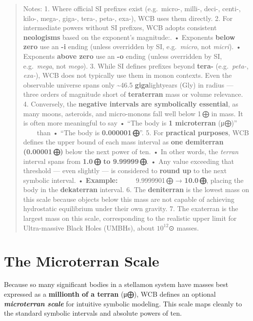 \documentclass[
  letterpaper,
]{book}
\begin{document}
\begin{quote}
Notes: 1. Where official SI prefixes exist (e.g.~micro-, milli-, deci-,
centi-, kilo-, mega-, giga-, tera-, peta-, exa-), WCB uses them
directly. 2. For intermediate powers without SI prefixes, WCB adopts
consistent \textbf{neologisms} based on the exponent's magnitude:. •
Exponents \textbf{below zero} use an \textbf{-i} ending (unless
overridden by SI, e.g.~\emph{micro}, not \emph{micri}). • Exponents
\textbf{above zero} use an \textbf{-o} ending (unless overridden by SI,
e.g.~\emph{mega}, not \emph{mego}). 3. While SI defines prefixes beyond
\textbf{tera-} (e.g.~\emph{peta-}, \emph{exa-}), WCB does not typically
use them in monon contexts. Even the observable universe spans only
\textasciitilde46.5 \textbf{giga}lightyears (Gly) in radius --- three
orders of magnitude short of \textbf{teraterran} mass or volume
relevance. 4. Conversely, the \textbf{negative intervals are
symbolically essential}, as many moons, asteroids, and micro-monons fall
well below 1\,⨁ in mass. It is often more meaningful to say • ``The body
is \textbf{1 microterran} (μ⨁)'' \(\qquad\)than • ``The body is
\textbf{0.000001\,⨁}''. 5. For \textbf{practical purposes}, WCB defines
the upper bound of each mass interval as \textbf{one demiterran
(0.00001\,⨁)} below the next power of ten. • In other words, the
\emph{terran} interval spans from \textbf{1.0\,⨁ to 9.99999\,⨁}. • Any
value exceeding that threshold --- even slightly --- is considered to
\textbf{round up} to the next symbolic interval. • \textbf{Example:}
\(\qquad\) 9.9999901\,⨁ → \textbf{10.0\,⨁}, placing the body in the
\textbf{dekaterran} interval. 6. The \textbf{deniterran} is the lowest
mass on this scale because objects below this mass are not capable of
achieving hydrostatic equilibrium under their own gravity. 7. The
exaterran is the largest mass on this scale, corresponding to the
realistic upper limit for Ultra-massive Black Holes (UMBHs), about
\(10^{12}\)⊙ masses.
\end{quote}

\section{The Microterran Scale}\label{the-microterran-scale}

Because so many significant bodies in a stellamon system have masses
best expressed as a \textbf{millionth of a terran} (μ⨁), WCB defines an
optional \textbf{\emph{microterran scale}} for intuitive symbolic
modeling. This scale maps cleanly to the standard symbolic intervals and
absolute powers of ten.
\end{document}
